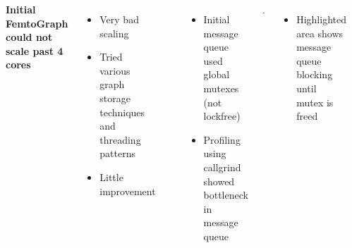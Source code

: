 \documentclass[25pt, portrait,  margin=0mm, innermargin=15mm,
  blockverticalspace=15mm, colspace=15mm, subcolspace=8mm]{tikzposter}
\begin{document}
\begin{columns}
{    }
     {
      \textbf{Initial FemtoGraph could not scale past 4 cores}
      \begin{itemize}
      \item  Very bad scaling
      \item Tried various graph storage techniques and threading patterns
      \item Little improvement
      \end{itemize}
      \setcounter{figurecounter}{98}
      \begin{tikzfigure}
        \includegraphics[width=0.65\linewidth]{before.png}
      \end{tikzfigure}
      \begin{itemize}
      \item Initial message queue used global mutexes (not lockfree) 
      \item Profiling using callgrind showed bottleneck in message queue
      \end{itemize}
      \setcounter{figurecounter}{98}
      \begin{tikzfigure}
        \includegraphics[width=0.85\linewidth]{callgrind.png}
      \end{tikzfigure}
      \begin{itemize}
      \item Highlighted area shows message queue blocking until mutex is freed
      \end{itemize}


      }
    

\end{columns}
\end{document}
